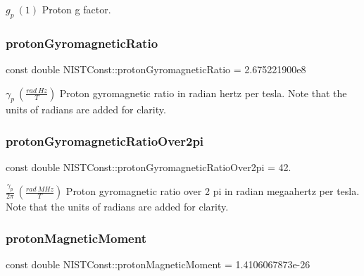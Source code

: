 $g_p \ (1)$ Proton g factor. \mbox{\label{group___n_i_s_t_const-_proton_ga5e708f58aaae8033705f05bc13507873}} 
\subsubsection{\texorpdfstring{proton\+Gyromagnetic\+Ratio}{protonGyromagneticRatio}}
{\footnotesize\ttfamily const double N\+I\+S\+T\+Const\+::proton\+Gyromagnetic\+Ratio = 2.\+675221900e8}

$\gamma_p \ (\frac{rad\ Hz}{T})$ Proton gyromagnetic ratio in radian hertz per tesla. Note that the units of radians are added for clarity. \mbox{\label{group___n_i_s_t_const-_proton_ga54ecf0d1090a1b2c9f7b301add8904b0}} 
\subsubsection{\texorpdfstring{proton\+Gyromagnetic\+Ratio\+Over2pi}{protonGyromagneticRatioOver2pi}}
{\footnotesize\ttfamily const double N\+I\+S\+T\+Const\+::proton\+Gyromagnetic\+Ratio\+Over2pi = 42.}

$\frac{\gamma_p}{2\pi} \ (\frac{rad\ MHz}{T})$ Proton gyromagnetic ratio over 2 pi in radian megaahertz per tesla. Note that the units of radians are added for clarity. \mbox{\label{group___n_i_s_t_const-_proton_ga931c9d53a62cee8eb68b4e930d0cf5a6}} 
\subsubsection{\texorpdfstring{proton\+Magnetic\+Moment}{protonMagneticMoment}}
{\footnotesize\ttfamily const double N\+I\+S\+T\+Const\+::proton\+Magnetic\+Moment = 1.\+4106067873e-\/26}

